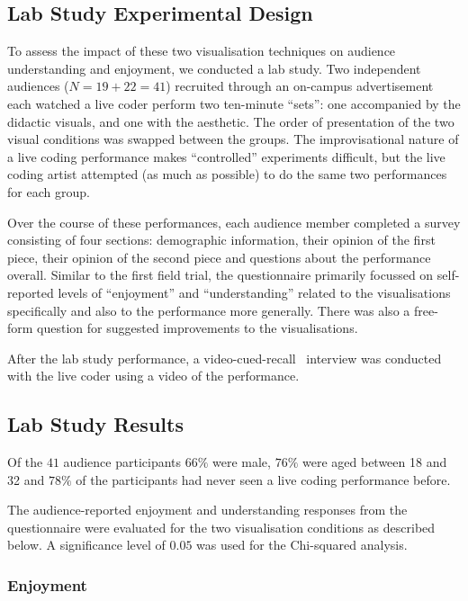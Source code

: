 \documentclass{sig-alternate}
\begin{document}
\subsection{Lab Study Experimental Design}

To assess the impact of these two visualisation techniques on audience
understanding and enjoyment, we conducted a lab study. Two independent
audiences ($N=19+22=41$) recruited through an on-campus advertisement
each watched a live coder perform two ten-minute ``sets'': one
accompanied by the didactic visuals, and one with the aesthetic. The
order of presentation of the two visual conditions was swapped between
the groups. The improvisational nature of a live coding performance
makes ``controlled'' experiments difficult, but the live coding artist
attempted (as much as possible) to do the same two performances for
each group.

Over the course of these performances, each audience member completed
a survey consisting of four sections: demographic information, their
opinion of the first piece, their opinion of the second piece and
questions about the performance overall. Similar to the first field
trial, the questionnaire primarily focussed on self-reported levels of
``enjoyment'' and ``understanding'' related to the visualisations
specifically and also to the performance more generally. There was
also a free-form question for suggested improvements to the
visualisations.

After the lab study performance, a
video-cued-recall~\cite{Suchman:1992tk} interview was conducted with
the live coder using a video of the performance.

\subsection{Lab Study Results}

Of the $41$ audience participants $66\%$ were male, $76\%$ were aged
between 18 and 32 and $78\%$ of the participants had never seen a live
coding performance before.

The audience-reported enjoyment and understanding responses from the
questionnaire were evaluated for the two visualisation conditions as
described below. A significance level of $0.05$ was used for the
Chi-squared analysis.

\subsubsection{Enjoyment}
\end{document}
